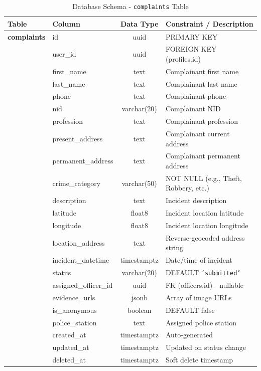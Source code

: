 \documentclass[12pt, a4paper, twoside]{report}
\begin{document}
\begin{table}[ht]
\centering
\caption{Database Schema - \texttt{complaints} Table}
\label{tab:complaints}
\begin{tabularx}{\textwidth}{p{3cm} p{3cm} c X}
\toprule
\textbf{Table} & \textbf{Column} & \textbf{Data Type} & \textbf{Constraint / Description} \\
\midrule
\textbf{complaints} & id & uuid & PRIMARY KEY \\
& user\_id & uuid & FOREIGN KEY (profiles.id) \\
& first\_name & text & Complainant first name \\
& last\_name & text & Complainant last name \\
& phone & text & Complainant phone \\
& nid & varchar(20) & Complainant NID \\
& profession & text & Complainant profession \\
& present\_address & text & Complainant current address \\
& permanent\_address & text & Complainant permanent address \\
& crime\_category & varchar(50) & NOT NULL (e.g., Theft, Robbery, etc.) \\
& description & text & Incident description \\
& latitude & float8 & Incident location latitude \\
& longitude & float8 & Incident location longitude \\
& location\_address & text & Reverse-geocoded address string \\
& incident\_datetime & timestamptz & Date/time of incident \\
& status & varchar(20) & DEFAULT \texttt{'submitted'} \\
& assigned\_officer\_id & uuid & FK (officers.id) - nullable \\
& evidence\_urls & jsonb & Array of image URLs \\
& is\_anonymous & boolean & DEFAULT false \\
& police\_station & text & Assigned police station \\
& created\_at & timestamptz & Auto-generated \\
& updated\_at & timestamptz & Updated on status change \\
& deleted\_at & timestamptz & Soft delete timestamp \\
\bottomrule
\end{tabularx}
\end{table}
\end{document}
